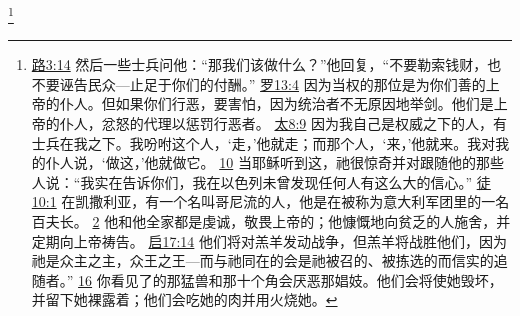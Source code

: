 \documentclass[12pt, a4paper, oneside]{ctexart}
\begin{document}
	\footnote {
		\href{https://biblehub.com/luke/3-14.htm}{路3:14} 然后一些士兵问他：“那我们该做什么？”他回复，“不要勒索钱财，也不要诬告民众---止足于你们的付酬。”
		\href{https://biblehub.com/romans/13-4.htm}{罗13:4} 因为当权的那位是为你们善的上帝的仆人。但如果你们行恶，要害怕，因为统治者不无原因地举剑。他们是上帝的仆人，忿怒的代理以惩罚行恶者。
		\href{https://biblehub.com/matthew/8-9.htm}{太8:9} 因为我自己是权威之下的人，有士兵在我之下。我吩咐这个人，‘走，’他就走；而那个人，‘来，’他就来。我对我的仆人说，‘做这，’他就做它。
		\href{https://biblehub.com/matthew/8-10.htm}{10} 当耶稣听到这，祂很惊奇并对跟随他的那些人说：“我实在告诉你们，我在以色列未曾发现任何人有这么大的信心。”
		\href{https://biblehub.com/acts/10-1.htm}{徒10:1} 在凯撒利亚，有一个名叫哥尼流的人，他是在被称为意大利军团里的一名百夫长。
		\href{https://biblehub.com/acts/10-2.htm}{2} 他和他全家都是虔诚，敬畏上帝的；他慷慨地向贫乏的人施舍，并定期向上帝祷告。
		\href{https://biblehub.com/revelation/17-14.htm}{启17:14} 他们将对羔羊发动战争，但羔羊将战胜他们，因为祂是众主之主，众王之王---而与祂同在的会是祂被召的、被拣选的而信实的追随者。”
		\href{https://biblehub.com/revelation/17-16.htm}{16} 你看见了的那猛兽和那十个角会厌恶那娼妓。他们会将使她毁坏，并留下她裸露着；他们会吃她的肉并用火烧她。
	}
\end{document}
